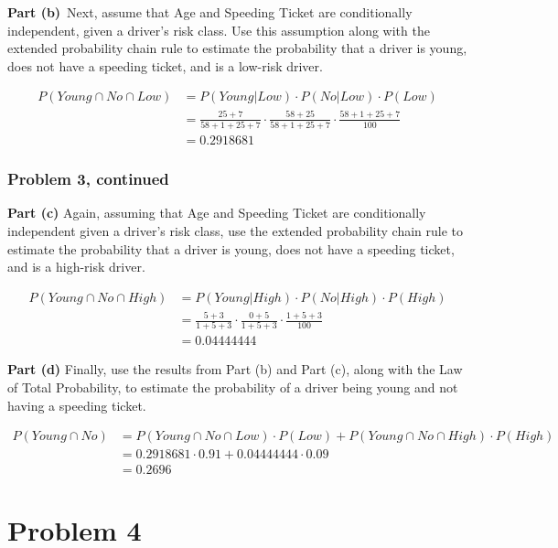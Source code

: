 \documentclass[12pt]{article}
\theoremstyle{definition}
\begin{document}
\vspace{1in}
\noindent
{\bf Part (b)}\ Next, assume that Age and Speeding Ticket are conditionally independent, given a driver's risk class. Use this assumption along with the extended probability chain rule to estimate the probability that a driver is young, does not have a speeding ticket, and is a low-risk driver.

\begin{align*}
P(Young \cap No \cap Low) &= P(Young | Low) \cdot P(No|Low) \cdot P(Low)\\
&= \frac{25 + 7}{58 + 1 + 25 + 7} \cdot \frac{58 + 25}{58 + 1 + 25 + 7} \cdot \frac{58 + 1 + 25 + 7}{100}\\
&= 0.2918681
\end{align*}

\newpage
\subsubsection*{Problem 3, continued}

\bigskip
\noindent
{\bf Part (c)} Again, assuming that Age and Speeding Ticket are conditionally independent given a driver's risk class, use the extended probability chain rule to estimate the probability that a driver is young, does not have a speeding ticket, and is a high-risk driver.

\begin{align*}
P(Young \cap No \cap High) &= P(Young | High) \cdot P(No|High) \cdot P(High)\\
&= \frac{5 + 3}{1 + 5 + 3} \cdot \frac{0 + 5}{1 + 5 + 3} \cdot \frac{1 + 5 + 3}{100}\\
&= 0.04444444
\end{align*}

\vspace{0.5in}
\noindent
{\bf Part (d)} Finally, use the results from Part (b) and Part (c), along with the Law of Total Probability, to estimate the probability of a driver being young and not having a speeding ticket.

\begin{align*}
P(Young \cap No) &= P(Young \cap No \cap Low) \cdot P(Low) + P(Young \cap No \cap High) \cdot P(High)\\
&= 0.2918681 \cdot 0.91 + 0.04444444 \cdot 0.09\\
&= 0.2696
\end{align*}

\newpage
\section*{Problem 4}
\end{document}

